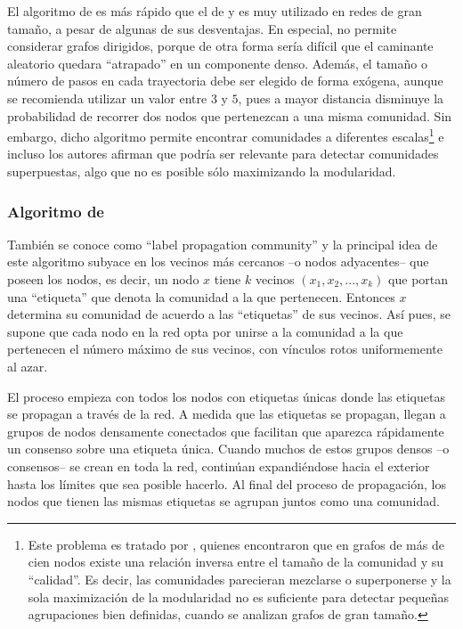 \documentclass[12pt,letter]{article}
\begin{document}
El algoritmo de \cite{Pons} es más rápido que el de \cite{Girvan1, Girvan2} y es muy utilizado en redes de gran tamaño, a pesar de algunas de sus desventajas. En especial, no permite considerar grafos dirigidos, porque de otra forma sería difícil que el caminante aleatorio quedara ``atrapado'' en un componente denso. Además, el tamaño o número de pasos en cada trayectoria debe ser elegido de forma exógena, aunque se recomienda utilizar un valor entre $3$ y $5$, pues a mayor distancia disminuye la probabilidad de recorrer dos nodos que pertenezcan a una misma comunidad. Sin embargo, dicho algoritmo permite encontrar comunidades a diferentes escalas\footnote{Este problema es tratado por \cite{Leskovec1}, quienes encontraron que en grafos de más de cien nodos existe una relación inversa entre el tamaño de la comunidad y su ``calidad''. Es decir, las comunidades parecieran mezclarse o superponerse y la sola maximización de la modularidad no es suficiente para detectar pequeñas agrupaciones bien definidas, cuando se analizan grafos de gran tamaño.} e incluso los autores afirman que podría ser relevante para detectar comunidades superpuestas, algo que no es posible sólo maximizando la modularidad.

\subsubsection{Algoritmo de  \cite{Raghavan}}

También se conoce como ``label propagation community'' y la principal idea de este algoritmo subyace en los vecinos más cercanos --o nodos adyacentes-- que poseen los nodos, es decir, un nodo $x$ tiene $k$ vecinos $(x_1, x_2, ..., x_k)$ que portan una ``etiqueta'' que denota la comunidad a la que pertenecen. Entonces $x$ determina su comunidad de acuerdo a las ``etiquetas'' de sus vecinos. Así pues, se supone que cada nodo en la red opta por unirse a la comunidad a la que pertenecen el número máximo de sus vecinos, con vínculos rotos uniformemente al azar.

\vspace{0.5cm}

El proceso empieza con todos los nodos con etiquetas únicas donde las etiquetas se propagan a través de la red. A medida que las etiquetas se propagan, llegan a grupos de nodos densamente conectados que facilitan que aparezca rápidamente un consenso sobre una etiqueta única. Cuando muchos de estos grupos densos --o consensos-- se crean en toda la red, continúan expandiéndose hacia el exterior hasta los límites que sea posible hacerlo. Al final del proceso de propagación, los nodos que tienen las mismas etiquetas se agrupan juntos como una comunidad.
\end{document}
